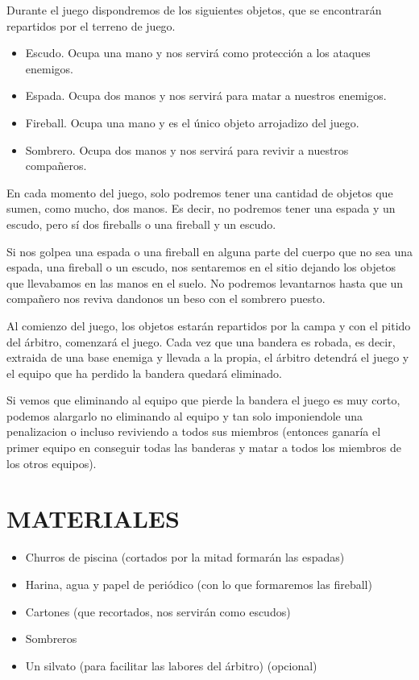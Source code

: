 \documentclass[72pt]{article}
\begin{document}
Durante el juego dispondremos de los siguientes objetos, que se encontrarán repartidos por el terreno
de juego.
\begin{itemize}
    \item Escudo. Ocupa una mano y nos servirá como protección a los ataques enemigos.
    \item Espada. Ocupa dos manos y nos servirá para matar a nuestros enemigos.
    \item Fireball. Ocupa una mano y es el único objeto arrojadizo del juego.
    \item Sombrero. Ocupa dos manos y nos servirá para revivir a nuestros compañeros.
\end{itemize}
En cada momento del juego, solo podremos tener una cantidad de objetos que sumen, como mucho, dos manos.
Es decir, no podremos tener una espada y un escudo, pero sí dos fireballs o una fireball y un escudo.

Si nos golpea una espada o una fireball en alguna parte del cuerpo que no sea una espada, una fireball
o un escudo, nos sentaremos en el sitio dejando los objetos que llevabamos en las manos en el suelo. No podremos
levantarnos hasta que un compañero nos reviva dandonos un beso con el sombrero puesto.

Al comienzo del juego, los objetos estarán repartidos por la campa y con el pitido del árbitro, comenzará el
juego. Cada vez que una bandera es robada, es decir, extraida de una base enemiga y llevada a la propia, el 
árbitro detendrá el juego y el equipo que ha perdido la bandera quedará eliminado.

Si vemos que eliminando al equipo que pierde la bandera el juego es muy corto, podemos alargarlo no eliminando
al equipo y tan solo imponiendole una penalizacion o incluso reviviendo a todos sus miembros (entonces ganaría 
el primer equipo en conseguir todas las banderas y matar a todos los miembros de los otros equipos).

\section*{MATERIALES}
\begin{itemize}
    \item Churros de piscina (cortados por la mitad formarán las espadas)
    \item Harina, agua y papel de periódico (con lo que formaremos las fireball)
    \item Cartones (que recortados, nos servirán como escudos)
    \item Sombreros
    \item Un silvato (para facilitar las labores del árbitro) (opcional)
\end{itemize}
\end{document}
